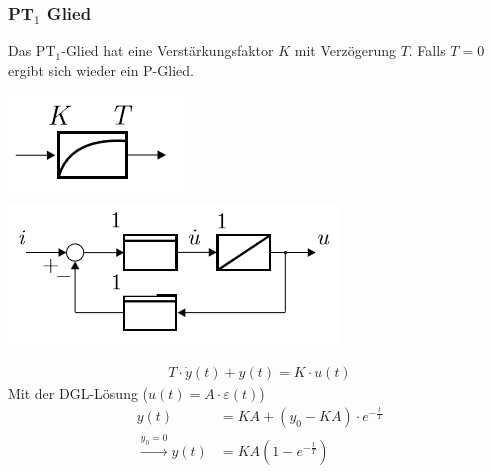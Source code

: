 \subsubsection{PT$_1$ Glied}
Das PT$_1$-Glied hat eine Verstärkungsfaktor $K$ mit Verzögerung $T$. Falls $T=0$ ergibt sich wieder ein P-Glied.
\begin{center}
	\begin{minipage}{0.20\textwidth}
		\begin{center}
			\includegraphics[width=0.5\linewidth,keepaspectratio=true]{Images/pt1glied}\\
			\includegraphics[width=\columnwidth]{Images/pt1glied_adv}
		\end{center}
	\end{minipage}%
	\begin{minipage}{0.3\textwidth}
		\begin{align*}
			T \cdot \dot{y}(t) + y(t) = K \cdot u(t)
		\end{align*}
		Mit der DGL-Lösung ($u(t) = A \cdot \varepsilon(t)$)
		\begin{align*}
			y(t) &= KA +(y_0 - KA)\cdot e^{-\frac{t}{T}}\\ 
			\xrightarrow{y_0 = 0} y(t) &= KA (1 -e^{-\frac{t}{T}}) \\ 
		\end{align*}
	\end{minipage}
\end{center}


